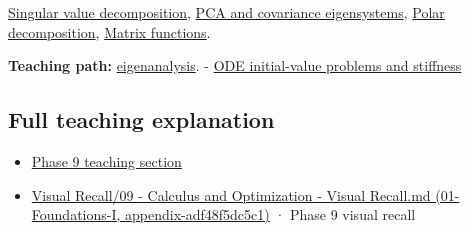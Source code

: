 \hyperref[appendix-1fad5e7f36fa]{Singular value decomposition}, \hyperref[appendix-ad175ef3c5bf]{PCA and covariance eigensystems}, \hyperref[appendix-73f5bcf7a462]{Polar decomposition}, \hyperref[appendix-0f4bc2bf2b1f]{Matrix functions}.

\textbf{Teaching path:} \href{Continuous\%20Notes/Computing\%20Foundations\%20-\%20From\%20Bits\%20to\%20C++\%20and\%20Systems\%20APIs\#Eigenvectors\%20reveal\%20the\%20directions\%20a\%20square\%20map\%20does\%20not\%20turn}{eigenanalysis}. - \hyperref[appendix-e8ab9836882e]{ODE initial-value problems and stiffness}

\subsection{Full teaching explanation}\label{full-teaching-explanation}

\begin{itemize}
\tightlist
\item
  \href{Continuous\%20Notes/Computing\%20Foundations\%20-\%20From\%20Bits\%20to\%20C++\%20and\%20Systems\%20APIs\#ODEs\%20and\%20numerical\%20simulation}{Phase 9 teaching section}
\item
  \href{}{Visual Recall/09 - Calculus and Optimization - Visual Recall.md (01-Foundations-I, appendix-adf48f5dc5c1)} · Phase 9 visual recall
\end{itemize}
